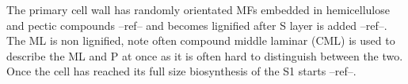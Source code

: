 The primary cell wall has randomly orientated MFs embedded
in hemicellulose and pectic compounds --ref-- and becomes lignified after S layer is added --ref--.
The ML is non lignified, note often compound middle laminar (CML) is used to describe
the ML and P at once as it is often hard to distinguish between the two. Once the cell has reached its
full size biosynthesis of the S1 starts --ref--.